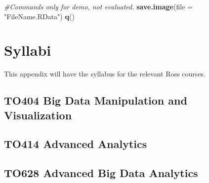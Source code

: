 \documentclass[]{krantz}
\makeatletter
\newenvironment{Shaded}{\begin{snugshade}}{\end{snugshade}}
\newcommand{\KeywordTok}[1]{\textcolor[rgb]{0.27,0.27,0.27}{\textbf{#1}}}
\newcommand{\DataTypeTok}[1]{\textcolor[rgb]{0.27,0.27,0.27}{#1}}
\newcommand{\StringTok}[1]{\textcolor[rgb]{0.5,0.5,0.5}{#1}}
\newcommand{\CommentTok}[1]{\textcolor[rgb]{0.56,0.35,0.01}{\textit{#1}}}
\newcommand{\NormalTok}[1]{#1}
\newenvironment{kframe}{%
\medskip{}
\setlength{\fboxsep}{.8em}
 \def\at@end@of@kframe{}%
 \ifinner\ifhmode%
  \def\at@end@of@kframe{\end{minipage}}%
  \begin{minipage}{\columnwidth}%
 \fi\fi%
 \def\FrameCommand##1{\hskip\@totalleftmargin \hskip-\fboxsep
 \colorbox{shadecolor}{##1}\hskip-\fboxsep
     \hskip-\linewidth \hskip-\@totalleftmargin \hskip\columnwidth}%
 \MakeFramed {\advance\hsize-\width
   \@totalleftmargin\z@ \linewidth\hsize
   \@setminipage}}%
 {\par\unskip\endMakeFramed%
 \at@end@of@kframe}
\renewenvironment{Shaded}{\begin{kframe}}{\end{kframe}}
\theoremstyle{definition}
\theoremstyle{definition}
\theoremstyle{definition}
\theoremstyle{remark}
\makeatother
\begin{document}
\begin{Shaded}
\begin{Highlighting}[]
\CommentTok{#Commands only for demo, not evaluated.}
\KeywordTok{save.image}\NormalTok{(}\DataTypeTok{file =} \StringTok{"FileName.RData"}\NormalTok{)}
\KeywordTok{q}\NormalTok{()}
\end{Highlighting}
\end{Shaded}

\cleardoublepage 

\appendix {}


\chapter{Syllabi}\label{syllabi}

This appendix will have the syllabus for the relevant Ross courses.

\section{TO404 Big Data Manipulation and
Visualization}\label{to404-big-data-manipulation-and-visualization}

\section{TO414 Advanced Analytics}\label{to414-advanced-analytics}

\section{TO628 Advanced Big Data
Analytics}\label{to628-advanced-big-data-analytics}



\backmatter
\printindex
\end{document}
